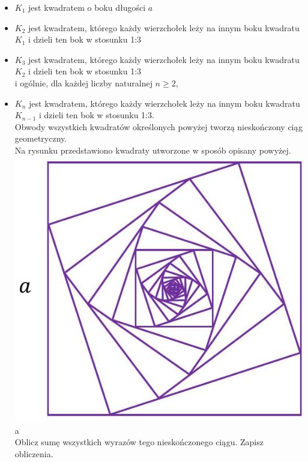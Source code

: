 \documentclass[10pt]{article}
\begin{document}
\begin{itemize}
  \item \(K_{1}\) jest kwadratem o boku długości \(a\)
  \item \(K_{2}\) jest kwadratem, którego każdy wierzchołek leży na innym boku kwadratu \(K_{1}\) i dzieli ten bok w stosunku 1:3
  \item \(K_{3}\) jest kwadratem, którego każdy wierzchołek leży na innym boku kwadratu \(K_{2}\) i dzieli ten bok w stosunku 1:3\\
i ogólnie, dla każdej liczby naturalnej \(n \geq 2\),
  \item \(K_{n}\) jest kwadratem, którego każdy wierzchołek leży na innym boku kwadratu \(K_{n-1}\) i dzieli ten bok w stosunku 1:3.\\
Obwody wszystkich kwadratów określonych powyżej tworzą nieskończony ciąg geometryczny.\\
Na rysunku przedstawiono kwadraty utworzone w sposób opisany powyżej.\\
\includegraphics[max width=\textwidth, center]{2024_11_21_f1ecc00f5c4ab21f0d04g-16(2)}\\
a\\
Oblicz sumę wszystkich wyrazów tego nieskończonego ciągu. Zapisz obliczenia.
\end{itemize}
\end{document}
